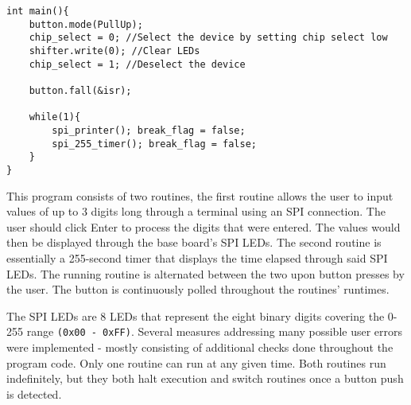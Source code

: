 \documentclass{article}
\begin{document}
\begin{verbatim}
int main(){
    button.mode(PullUp);
    chip_select = 0; //Select the device by setting chip select low
    shifter.write(0); //Clear LEDs
    chip_select = 1; //Deselect the device
    
    button.fall(&isr);
    
    while(1){
        spi_printer(); break_flag = false;
        spi_255_timer(); break_flag = false;   
    }
}
\end{verbatim}
\pagebreak

This program consists of two routines, the first routine allows the user to 
input values of up to 3 digits long through a terminal using an SPI connection. The user should click Enter to process the digits that were entered.
The values would then be displayed through the base board's SPI LEDs.
The second routine is essentially a 255-second timer that displays the time
elapsed through said SPI LEDs. The running routine is alternated between the two upon button presses by the user. The button is continuously polled throughout the routines' runtimes.

The SPI LEDs are 8 LEDs that represent the eight binary digits covering the 0-255 range \texttt{(0x00 - 0xFF)}. Several measures addressing many possible user errors were implemented - mostly consisting of additional checks done throughout the program code. Only one routine can run at any given time. Both routines run indefinitely, but they both halt execution and switch routines once a button push is detected.

\pagebreak
\end{document}
